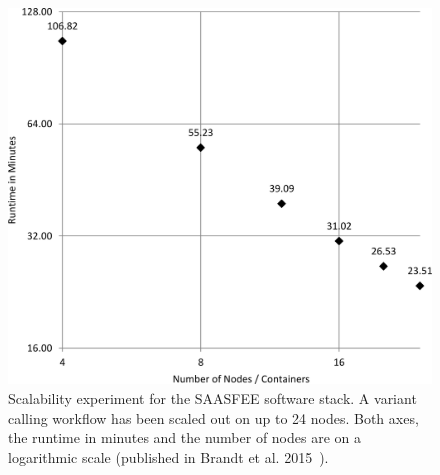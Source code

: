 \begin{figure}
  \centering
  \includegraphics[width=.55\textwidth]{imgs/wf_runtime.png}
  \caption{Scalability experiment for the SAASFEE software stack. A variant calling workflow has been scaled out on up to 24 nodes. Both axes, the runtime in minutes and the number of nodes are on a logarithmic scale (published in Brandt et al. 2015~\cite{Brandt2015}).}
  \label{fig:saasfee_scaling}
\end{figure}
\vspace{-5mm}

